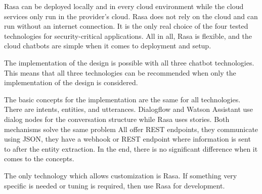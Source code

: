 Rasa can be deployed locally and in every cloud environment while the cloud services only run in the provider's cloud.
Rasa does not rely on the cloud and can run without an internet connection. 
It is the only real choice of the four tested technologies for security-critical applications.
All in all, Rasa is flexible, and the cloud chatbots are simple when it comes to deployment and setup.

The implementation of the design is possible with all three chatbot technologies.
This means that all three technologies can be recommended when only the implementation of the design is considered.

The basic concepts for the implementation are the same for all technologies.
There are intents, entities, and utterances.
Dialogflow and Watson Assistant use dialog nodes for the conversation structure while Rasa uses stories. 
Both mechanisms solve the same problem
All offer REST endpoints, they communicate using JSON, they have a webhook or REST endpoint where information is sent to after the entity extraction.
In the end, there is no significant difference when it comes to the concepts.

The only technology which allows customization is Rasa.
If something very specific is needed or tuning is required, then use Rasa for development.

